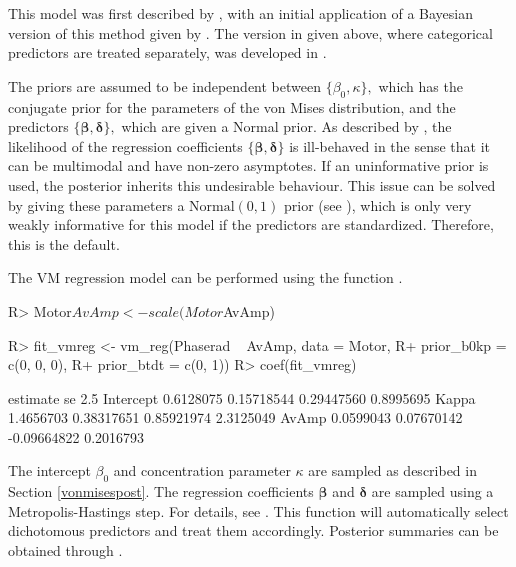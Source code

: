 This model was first described by \citet{fisher1992regression}, with an
initial application of a Bayesian version of this method given by
\citet{gill2010}. The version in  given above, where
categorical predictors are treated separately, was developed in
\citet{mulder2017bayesian}.

The priors are assumed to be independent between
\(\{\beta_0, \kappa\},\) which has the conjugate prior for the
parameters of the von Mises distribution, and the predictors
\(\{\boldsymbol{\beta}, \boldsymbol{\delta}\},\) which are given a
Normal prior. As described by \citet{gill2010}, the likelihood of the
regression coefficients \(\{\boldsymbol{\beta}, \boldsymbol{\delta}\}\)
is ill-behaved in the sense that it can be multimodal and have non-zero
asymptotes. If an uninformative prior is used, the posterior inherits
this undesirable behaviour. This issue can be solved by giving these
parameters a \(\text{Normal}(0, 1)\) prior (see
\citet{mulder2017bayesian}), which is only very weakly informative for
this model if the predictors are standardized. Therefore, this is the
default.

The VM regression model can be performed using the function
.

\begin{CodeChunk}

\begin{CodeInput}
R> Motor$AvAmp <- scale(Motor$AvAmp)
\end{CodeInput}
\end{CodeChunk}

\begin{CodeChunk}

\begin{CodeInput}
R> fit_vmreg <- vm_reg(Phaserad ~ AvAmp, data = Motor, 
R+                     prior_b0kp = c(0, 0, 0),
R+                     prior_btdt = c(0, 1))
R> coef(fit_vmreg)
\end{CodeInput}

\begin{CodeOutput}
           estimate         se        2.5%
Intercept 0.6128075 0.15718544  0.29447560 0.8995695
Kappa     1.4656703 0.38317651  0.85921974 2.3125049
AvAmp     0.0599043 0.07670142 -0.09664822 0.2016793
\end{CodeOutput}
\end{CodeChunk}

The intercept \(\beta_0\) and concentration parameter \(\kappa\) are
sampled as described in Section \ref{vonmisespost}. The regression
coefficients \(\boldsymbol{\beta}\) and \(\boldsymbol{\delta}\) are
sampled using a Metropolis-Hastings step. For details, see
\citep{mulder2017bayesian}. This function will automatically select
dichotomous predictors and treat them accordingly. Posterior summaries
can be obtained through .


